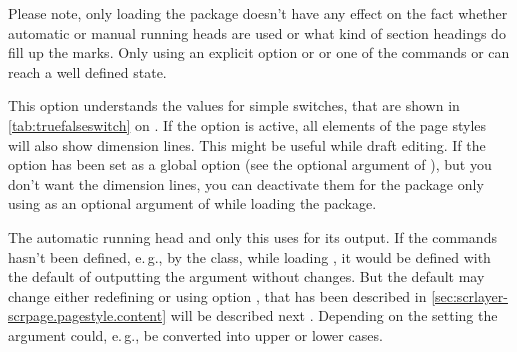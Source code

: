 Please note, only loading the package doesn't have
any effect on the fact whether automatic or manual running heads are used or
what kind of section headings do fill up the marks. Only using an explicit
option  or  or one of the commands
 or  can reach a well defined state.%
%
%
%
%
%
\fi %

\ifshortversion\IgnoreThistrue{}\fi
\ifIgnoreThis %
\else %

\begin{Declaration}
\end{Declaration}
%
This \KOMAScript{} option understands the values for simple switches, that are
shown in \autoref{tab:truefalseswitch} on . If
the option is active, all elements of the page styles will also show dimension
lines. This might be useful while draft editing. If the option has been set as
a global option (see the optional argument of ), but you
don't want the dimension lines, you can deactivate them for the package only
using  as an optional argument of 
while loading the package.%
%

\begin{Declaration}
\end{Declaration}
%
The automatic running head and only this uses  for its
output. If the commands hasn't been defined, e.\,g., by the class, while
loading , it would be defined with the default of outputting
the argument  without changes. But the default may change either
redefining  or using option , that
\ifshortversion has been described in
  \autoref{sec:scrlayer-scrpage.pagestyle.content}%
\else will be described next%
\fi%
. Depending on the setting the argument could, e.\,g., be converted into upper
or lower cases.
%
%
\fi %


